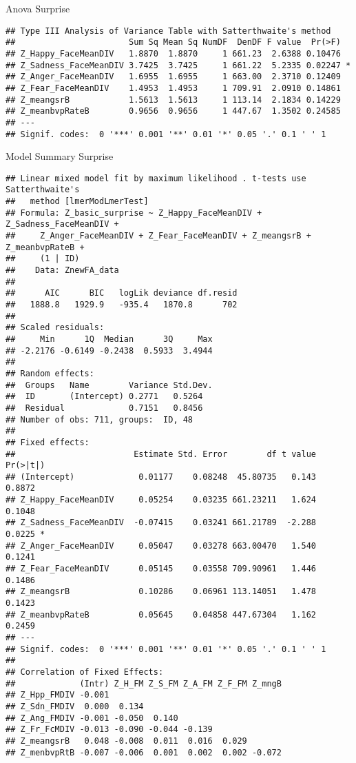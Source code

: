 \documentclass[
]{article}
\begin{document}
Anova Surprise

\begin{verbatim}
## Type III Analysis of Variance Table with Satterthwaite's method
##                       Sum Sq Mean Sq NumDF  DenDF F value  Pr(>F)  
## Z_Happy_FaceMeanDIV   1.8870  1.8870     1 661.23  2.6388 0.10476  
## Z_Sadness_FaceMeanDIV 3.7425  3.7425     1 661.22  5.2335 0.02247 *
## Z_Anger_FaceMeanDIV   1.6955  1.6955     1 663.00  2.3710 0.12409  
## Z_Fear_FaceMeanDIV    1.4953  1.4953     1 709.91  2.0910 0.14861  
## Z_meangsrB            1.5613  1.5613     1 113.14  2.1834 0.14229  
## Z_meanbvpRateB        0.9656  0.9656     1 447.67  1.3502 0.24585  
## ---
## Signif. codes:  0 '***' 0.001 '**' 0.01 '*' 0.05 '.' 0.1 ' ' 1
\end{verbatim}

Model Summary Surprise

\begin{verbatim}
## Linear mixed model fit by maximum likelihood . t-tests use Satterthwaite's
##   method [lmerModLmerTest]
## Formula: Z_basic_surprise ~ Z_Happy_FaceMeanDIV + Z_Sadness_FaceMeanDIV +  
##     Z_Anger_FaceMeanDIV + Z_Fear_FaceMeanDIV + Z_meangsrB + Z_meanbvpRateB +  
##     (1 | ID)
##    Data: ZnewFA_data
## 
##      AIC      BIC   logLik deviance df.resid 
##   1888.8   1929.9   -935.4   1870.8      702 
## 
## Scaled residuals: 
##     Min      1Q  Median      3Q     Max 
## -2.2176 -0.6149 -0.2438  0.5933  3.4944 
## 
## Random effects:
##  Groups   Name        Variance Std.Dev.
##  ID       (Intercept) 0.2771   0.5264  
##  Residual             0.7151   0.8456  
## Number of obs: 711, groups:  ID, 48
## 
## Fixed effects:
##                        Estimate Std. Error        df t value Pr(>|t|)  
## (Intercept)             0.01177    0.08248  45.80735   0.143   0.8872  
## Z_Happy_FaceMeanDIV     0.05254    0.03235 661.23211   1.624   0.1048  
## Z_Sadness_FaceMeanDIV  -0.07415    0.03241 661.21789  -2.288   0.0225 *
## Z_Anger_FaceMeanDIV     0.05047    0.03278 663.00470   1.540   0.1241  
## Z_Fear_FaceMeanDIV      0.05145    0.03558 709.90961   1.446   0.1486  
## Z_meangsrB              0.10286    0.06961 113.14051   1.478   0.1423  
## Z_meanbvpRateB          0.05645    0.04858 447.67304   1.162   0.2459  
## ---
## Signif. codes:  0 '***' 0.001 '**' 0.01 '*' 0.05 '.' 0.1 ' ' 1
## 
## Correlation of Fixed Effects:
##             (Intr) Z_H_FM Z_S_FM Z_A_FM Z_F_FM Z_mngB
## Z_Hpp_FMDIV -0.001                                   
## Z_Sdn_FMDIV  0.000  0.134                            
## Z_Ang_FMDIV -0.001 -0.050  0.140                     
## Z_Fr_FcMDIV -0.013 -0.090 -0.044 -0.139              
## Z_meangsrB   0.048 -0.008  0.011  0.016  0.029       
## Z_menbvpRtB -0.007 -0.006  0.001  0.002  0.002 -0.072
\end{verbatim}
\end{document}
